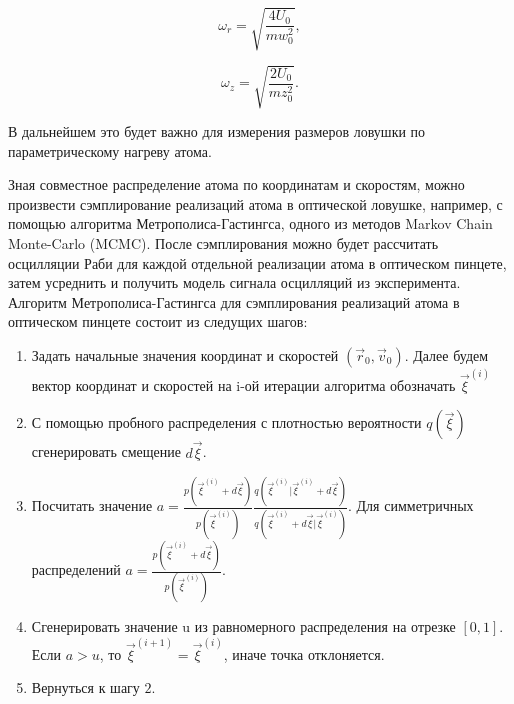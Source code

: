\begin{equation}
	\omega_r=\sqrt{\frac{4U_0}{mw_0^2}},
\end{equation}

\begin{equation}
	\omega_z=\sqrt{\frac{2U_0}{mz_0^2}}.
\end{equation}

В дальнейшем это будет важно для измерения размеров ловушки по параметрическому нагреву атома.
 	   	 
Зная совместное распределение атома по координатам и скоростям, можно произвести сэмплирование реализаций атома в оптической ловушке, например, с помощью алгоритма Метрополиса-Гастингса, одного из методов Markov Chain Monte-Carlo (MCMC). После сэмплирования можно будет рассчитать осцилляции Раби для каждой отдельной реализации атома в оптическом пинцете, затем усреднить и получить модель сигнала осцилляций из эксперимента. Алгоритм Метрополиса-Гастингса для сэмплирования реализаций атома в оптическом пинцете состоит из следущих шагов:

\begin{enumerate}
	\item Задать начальные значения координат и скоростей $\left(\vec{r}_0,\vec{v}_0\right)$. Далее будем вектор координат и скоростей на i-ой итерации алгоритма обозначать ${\vec{\xi}}^{\left(i\right)}$

	\item С помощью пробного распределения с плотностью вероятности $q\left(\vec{\xi}\right)$ сгенерировать смещение $d\vec{\xi}$.

	\item Посчитать значение $a=\frac{p\left({\vec{\xi}}^{\left(i\right)}+d\vec{\xi}\right)}{p\left({\vec{\xi}}^{\left(i\right)}\right)}\frac{q\left({\vec{\xi}}^{\left(i\right)}|{\vec{\xi}}^{\left(i\right)}+d\vec{\xi}\right)}{q\left({\vec{\xi}}^{\left(i\right)}+d\vec{\xi}|{\vec{\xi}}^{\left(i\right)}\right)}$. Для симметричных распределений $a=\frac{p\left({\vec{\xi}}^{\left(i\right)}+d\vec{\xi}\right)}{p\left({\vec{\xi}}^{\left(i\right)}\right)}$.

	\item Сгенерировать значение u из равномерного распределения на отрезке $\left[0,1\right]$. Если $a>u$, то ${\vec{\xi}}^{\left(i+1\right)}={\vec{\xi}}^{\left(i\right)}$, иначе точка отклоняется.

	\item Вернуться к шагу $2$.
\end{enumerate}

